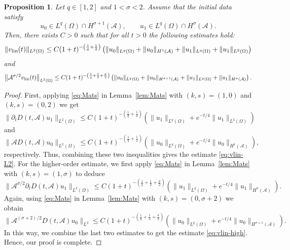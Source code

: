 \documentclass[a4paper,11pt]{article} %
\newtheorem{proposition}[theorem]{Proposition}
\theoremstyle{remark}
\theoremstyle{definition}
\numberwithin{equation}{section}
\begin{document}
\begin{proposition}
\label{lem:vlin}
Let \(q\in[1,2]\) and \(1<\sigma<2\). Assume that the initial data satisfy
\[
u_0\in L^q(\Omega)\cap H^{\sigma+1}(\mathcal{A}),
\qquad
u_1\in L^q(\Omega)\cap H^\sigma(\mathcal{A}).
\]
Then, there exists \(C>0\) such that for all \(t>0\) the following estimates hold:
\begin{equation}\label{eq:vlin-L2}
\|v_{\rm lin}(t)\|_{L^2(\Omega)}
\le
C(1+t)^{-\left(\frac1q+\frac12\right)}
\left(
\|u_0\|_{L^q(\Omega)}
+\|u_0\|_{H^1(\mathcal{A})}
+\|u_1\|_{L^q(\Omega)}
+\|u_1\|_{L^2(\Omega)}
\right)
\end{equation}
and
\begin{equation}\label{eq:vlin-high}
\big\|\mathcal{A}^{\sigma/2}v_{\rm lin}(t)\big\|_{L^2(\Omega)}
\le
C(1+t)^{-\left(\frac1q+\frac12+\frac{\sigma}{2}\right)}
\left(
\|u_0\|_{L^q(\Omega)}
+\|u_0\|_{H^{\sigma+1}(\mathcal{A})}
+\|u_1\|_{L^q(\Omega)}
+\|u_1\|_{H^\sigma(\mathcal{A})}
\right).
\end{equation} 
\end{proposition} 

\begin{proof}
First, applying \eqref{eq:Mats} in Lemma~\ref{lem:Mats} with $(k,s)=(1,0)$ and $(k,s)=(0,2)$ we get
\[
\big\|\partial_tD(t,\mathcal{A})u_1\big\|_{L^2(\Omega)}
\le
C(1+t)^{-\left(\frac1q+\frac12\right)}
\left(
\|u_1\|_{L^q(\Omega)}
+
e^{-t/4}\|u_1\|_{L^2(\Omega)}
\right)
\]
and
\[
\big\|\mathcal{A}D(t,\mathcal{A})u_0\big\|_{L^2(\Omega)}
\le
C(1+t)^{-\left(\frac1q+\frac12\right)}
\left(
\|u_0\|_{L^q(\Omega)}
+
e^{-t/4}\|u_0\|_{H^1(\mathcal{A})}
\right),
\]
respectively. Thus, combining these two inequalities gives the estimate \eqref{eq:vlin-L2}. For the higher-order estimate, we first apply \eqref{eq:Mats} in Lemma~\ref{lem:Mats} with $(k,s)=(1,\sigma)$ to deduce
\[
\big\|\mathcal{A}^{\sigma/2}\partial_tD(t,\mathcal{A})u_1\big\|_{L^2(\Omega)}
\le
C(1+t)^{-\left(\frac1q+\frac12+\frac{\sigma}{2}\right)}
\left(
\|u_1\|_{L^q(\Omega)}
+
e^{-t/4}\|u_1\|_{H^\sigma(\mathcal{A})}
\right).
\]
Again, using \eqref{eq:Mats} in Lemma~\ref{lem:Mats} with $(k,s)=(0,\sigma+2)$ we obtain
\[
\big\|\mathcal{A}^{(\sigma+2)/2}D(t,\mathcal{A})u_0\big\|_{L^2}
\le
C(1+t)^{-\left(\frac1q+\frac12+\frac{\sigma}{2}\right)}
\left(
\|u_0\|_{L^q(\Omega)}
+
e^{-t/4}\|u_0\|_{H^{\sigma+1}(\mathcal{A})}
\right).
\]
In this way, we combine the last two estimates to get the estimate \eqref{eq:vlin-high}. Hence, our proof is complete.
\end{proof}
\end{document}
